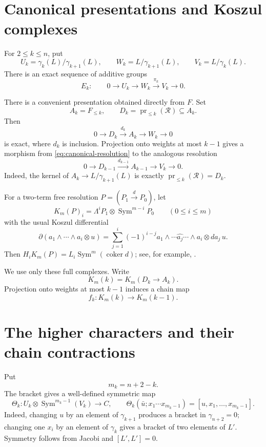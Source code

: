 \documentclass[11pt]{amsart}
\theoremstyle{remark}
\newcommand{\Sym}{\operatorname{Sym}}
\newcommand{\gm}{\gamma}
\newcommand{\Rel}{\mathcal R}
\newcommand{\pr}{\operatorname{pr}}
\begin{document}
\section{Canonical presentations and Koszul complexes}

For $2\leq k\leq n$, put
\[
 U_k=\gm_k(L)/\gm_{k+1}(L),\qquad
 W_k=L/\gm_{k+1}(L),\qquad
 V_k=L/\gm_k(L).
\]
There is an exact sequence of additive groups
\begin{equation}\label{eq:tower-extension}
 E_k:\qquad 0\longrightarrow U_k\longrightarrow W_k
 \xrightarrow{\pi_k}V_k\longrightarrow0.
\end{equation}

There is a convenient presentation obtained directly from $F$.  Set
\[
 A_k=F_{\leq k},
 \qquad
 D_k=\pr_{\leq k}(\Rel)\subseteq A_k.
\]
Then
\begin{equation}\label{eq:canonical-resolution}
 0\longrightarrow D_k\xrightarrow{d_k}A_k
 \longrightarrow W_k\longrightarrow0
\end{equation}
is exact, where $d_k$ is inclusion.  Projection onto weights at most
$k-1$ gives a morphism from \eqref{eq:canonical-resolution} to the
analogous resolution
\[
 0\longrightarrow D_{k-1}\xrightarrow{d_{k-1}}A_{k-1}
 \longrightarrow V_k\longrightarrow0.
\]
Indeed, the kernel of $A_k\to L/\gm_{k+1}(L)$ is exactly
$\pr_{\leq k}(\Rel)=D_k$.

For a two-term free resolution $P=(P_1\xrightarrow dP_0)$, let
\begin{equation}\label{eq:koszul}
 K_m(P)_i=\Lambda^iP_1\otimes\Sym^{m-i}P_0
 \qquad(0\leq i\leq m)
\end{equation}
with the usual Koszul differential
\[
 \partial(a_1\wedge\cdots\wedge a_i\otimes u)
 =\sum_{j=1}^i(-1)^{i-j}
 a_1\wedge\cdots\widehat{a_j}\cdots\wedge a_i
 \otimes da_j\,u.
\]
Then $H_iK_m(P)=L_i\Sym^m(\operatorname{coker}d)$; see, for example,
\cite{BM}.

We use only these full complexes.  Write
\[
 K_m(k)=K_m(D_k\longrightarrow A_k).
\]
Projection onto weights at most $k-1$ induces a chain map
\[
 f_k:K_m(k)\longrightarrow K_m(k-1).
\]

\section{The higher characters and their chain contractions}

Put
\[
                         m_k=n+2-k.
\]
The bracket gives a well-defined symmetric map
\begin{equation}\label{eq:theta-k}
 \Theta_k:U_k\otimes\Sym^{m_k-1}(V_k)\longrightarrow C,
 \qquad
 \Theta_k(\bar u;x_1\cdots x_{m_k-1})
 =[u,x_1,\ldots,x_{m_k-1}].
\end{equation}
Indeed, changing $u$ by an element of $\gm_{k+1}$ produces a bracket
in $\gm_{n+2}=0$; changing one $x_i$ by an element of $\gm_k$ gives
a bracket of two elements of $L'$.  Symmetry follows from Jacobi and
$[L',L']=0$.
\end{document}
